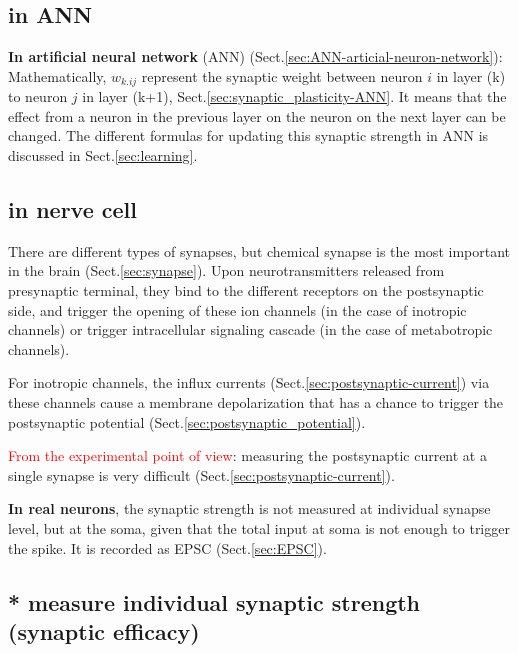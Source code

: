 
\subsection{in ANN}

{\bf In artificial neural network} (ANN)
(Sect.\ref{sec:ANN-articial-neuron-network}): Mathematically, $w_{k.ij}$
represent the synaptic weight between neuron $i$ in layer (k) to neuron $j$ in
layer (k+1), Sect.\ref{sec:synaptic_plasticity-ANN}. It means that the effect
from a neuron in the previous layer on the neuron on the next layer can be
changed. The different formulas for updating this synaptic strength in ANN is
discussed in Sect.\ref{sec:learning}.

\subsection{in nerve cell}
\label{sec:synaptic-strength-measure}
\label{sec:synaptic-strength}

There are different types of synapses, but chemical synapse is the most
important in the brain (Sect.\ref{sec:synapse}).
Upon neurotransmitters released from presynaptic terminal, they bind to the
different receptors on the postsynaptic side, and trigger the opening of these
ion channels (in the case of inotropic channels) or trigger intracellular
signaling cascade (in the case of metabotropic channels).

For inotropic channels, the influx currents
(Sect.\ref{sec:postsynaptic-current}) via these channels cause a membrane
depolarization that has a chance to trigger the postsynaptic potential
(Sect.\ref{sec:postsynaptic_potential}).

\textcolor{red}{From the experimental point of view}: measuring the
postsynaptic current at a single synapse is very difficult
(Sect.\ref{sec:postsynaptic-current}).

{\bf In real neurons}, the synaptic strength is not measured at individual
synapse level, but at the soma, given that the total input at soma is not enough to
trigger the spike. It is recorded as EPSC (Sect.\ref{sec:EPSC}).

\subsection{ * measure individual synaptic strength (synaptic efficacy)}

